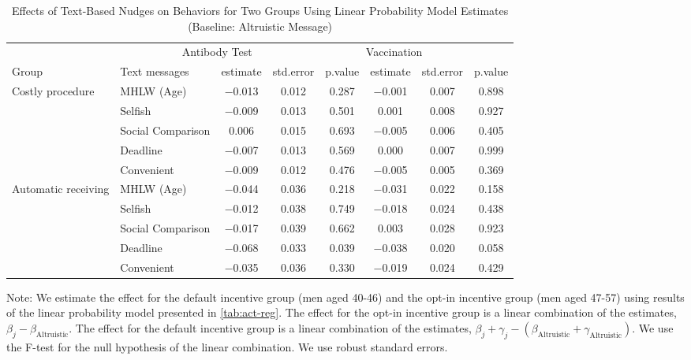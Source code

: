 \begin{table}

\caption{Effects of Text-Based Nudges on Behaviors for Two Groups Using Linear Probability Model Estimates (Baseline: Altruistic Message) \label{tab:act-reg-ftest2}}
\centering
\fontsize{9}{11}\selectfont
\begin{threeparttable}
\begin{tabular}[t]{>{\raggedright\arraybackslash}p{5em}lcccccc}
\toprule
\multicolumn{2}{c}{ } & \multicolumn{3}{c}{Antibody Test} & \multicolumn{3}{c}{Vaccination} \\
\cmidrule(l{3pt}r{3pt}){3-5} \cmidrule(l{3pt}r{3pt}){6-8}
Group & Text messages & estimate & std.error & p.value & estimate  & std.error  & p.value \\
\midrule
Costly procedure & MHLW (Age) & \num{-0.013} & \num{0.012} & \num{0.287} & \num{-0.001} & \num{0.007} & \num{0.898}\\
 & Selfish & \num{-0.009} & \num{0.013} & \num{0.501} & \num{0.001} & \num{0.008} & \num{0.927}\\
 & Social Comparison & \num{0.006} & \num{0.015} & \num{0.693} & \num{-0.005} & \num{0.006} & \num{0.405}\\
 & Deadline & \num{-0.007} & \num{0.013} & \num{0.569} & \num{0.000} & \num{0.007} & \num{0.999}\\
 & Convenient & \num{-0.009} & \num{0.012} & \num{0.476} & \num{-0.005} & \num{0.005} & \num{0.369}\\
Automatic receiving & MHLW (Age) & \num{-0.044} & \num{0.036} & \num{0.218} & \num{-0.031} & \num{0.022} & \num{0.158}\\
 & Selfish & \num{-0.012} & \num{0.038} & \num{0.749} & \num{-0.018} & \num{0.024} & \num{0.438}\\
 & Social Comparison & \num{-0.017} & \num{0.039} & \num{0.662} & \num{0.003} & \num{0.028} & \num{0.923}\\
 & Deadline & \num{-0.068} & \num{0.033} & \num{0.039} & \num{-0.038} & \num{0.020} & \num{0.058}\\
 & Convenient & \num{-0.035} & \num{0.036} & \num{0.330} & \num{-0.019} & \num{0.024} & \num{0.429}\\
\bottomrule
\end{tabular}
\begin{tablenotes}
\item Note: We estimate the effect for the default incentive group (men aged 40-46) and the opt-in incentive group (men aged 47-57) using results of the linear probability model presented in \ref{tab:act-reg}. The effect for the opt-in incentive group is a linear combination of the estimates, $\beta_j - \beta_{\text{Altruistic}}$. The effect for the default incentive group is a linear combination of the estimates, $\beta_j + \gamma_j - (\beta_{\text{Altruistic}} + \gamma_{\text{Altruistic}})$. We use the F-test for the null hypothesis of the linear combination. We use robust standard errors.
\end{tablenotes}
\end{threeparttable}
\end{table}
